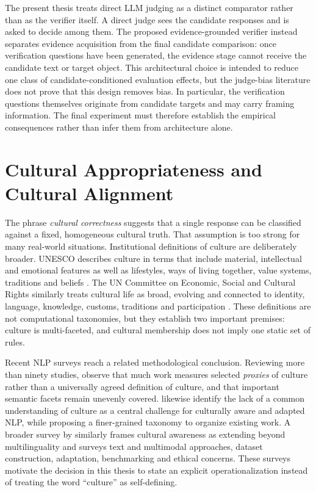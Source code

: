 The present thesis treats direct LLM judging as a distinct comparator rather than as the verifier itself. A direct judge sees the candidate responses and is asked to decide among them. The proposed evidence-grounded verifier instead separates evidence acquisition from the final candidate comparison: once verification questions have been generated, the evidence stage cannot receive the candidate text or target object. This architectural choice is intended to reduce one class of candidate-conditioned evaluation effects, but the judge-bias literature does not prove that this design removes bias. In particular, the verification questions themselves originate from candidate targets and may carry framing information. The final experiment must therefore establish the empirical consequences rather than infer them from architecture alone.

\section{Cultural Appropriateness and Cultural Alignment}
\label{sec:cultural-appropriateness}

The phrase \emph{cultural correctness} suggests that a single response can be classified against a fixed, homogeneous cultural truth. That assumption is too strong for many real-world situations. Institutional definitions of culture are deliberately broader. UNESCO describes culture in terms that include material, intellectual and emotional features as well as lifestyles, ways of living together, value systems, traditions and beliefs \parencite{unesco2001culturaldiversity}. The UN Committee on Economic, Social and Cultural Rights similarly treats cultural life as broad, evolving and connected to identity, language, knowledge, customs, traditions and participation \parencite{cescr2009gc21}. These definitions are not computational taxonomies, but they establish two important premises: culture is multi-faceted, and cultural membership does not imply one static set of rules.

Recent NLP surveys reach a related methodological conclusion. Reviewing more than ninety studies, \textcite{adilazuarda2024culture} observe that much work measures selected \emph{proxies} of culture rather than a universally agreed definition of culture, and that important semantic facets remain unevenly covered. \textcite{liu2025culturallyaware} likewise identify the lack of a common understanding of culture as a central challenge for culturally aware and adapted NLP, while proposing a finer-grained taxonomy to organize existing work. A broader survey by \textcite{pawar2025culturalawareness} similarly frames cultural awareness as extending beyond multilinguality and surveys text and multimodal approaches, dataset construction, adaptation, benchmarking and ethical concerns. These surveys motivate the decision in this thesis to state an explicit operationalization instead of treating the word ``culture'' as self-defining.

